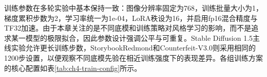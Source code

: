 \begin{table}[htbp]
  \centering
  \caption{实验硬件与软件环境}
  \label{tab:ch4-env}
\end{table}

训练参数在多轮实验中基本保持一致：图像分辨率固定为768，训练批量大小为1，梯度累积步数为2，学习率统一为1e-04，LoRA秩设为16，并启用fp16混合精度与TF32加速。由于本章关注的是不同底模和训练策略对风格学习的影响，而不是追求某一模型的极限拟合，因此参数设计强调公平与可重复。Stable Diffusion 1.5主线实验允许更长训练步数，StorybookRedmond和Counterfeit-V3.0则采用相同的1200步设置，以便观察不同底模先验在相近训练强度下的表现差异。各组训练方案的核心配置如表\ref{tab:ch4-train-config}所示。

